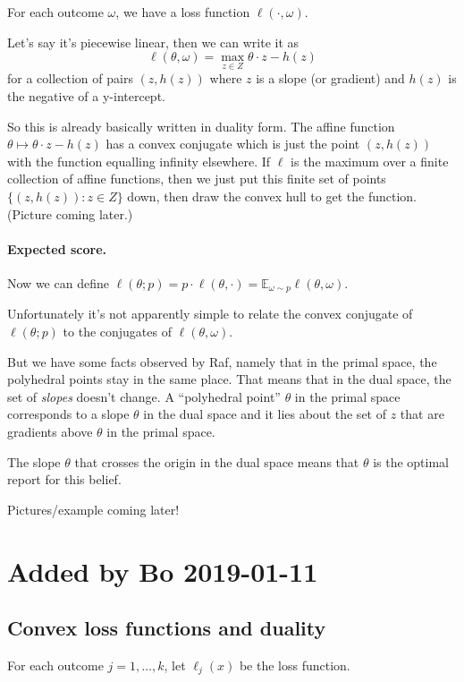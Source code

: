 \documentclass[12pt]{article}
\begin{document}
For each outcome $\omega$, we have a loss function $\ell(\cdot, \omega)$.

Let's say it's piecewise linear, then we can write it as
  \[ \ell(\theta, \omega) = \max_{z \in Z} \theta \cdot z - h(z) \]
for a collection of pairs $(z, h(z))$ where $z$ is a slope (or gradient) and $h(z)$ is the negative of a y-intercept.

So this is already basically written in duality form.
The affine function $\theta \mapsto \theta \cdot z - h(z)$ has a convex conjugate which is just the point $(z, h(z))$ with the function equalling infinity elsewhere.
If $\ell$ is the maximum over a finite collection of affine functions, then we just put this finite set of points $\{(z,h(z)) : z \in Z\}$ down, then draw the convex hull to get the function.
(Picture coming later.)

\paragraph{Expected score.}
Now we can define $\ell(\theta ; p) = p \cdot \ell(\theta, \cdot) = \mathbb{E}_{\omega \sim p} \ell(\theta, \omega)$.

Unfortunately it's not apparently simple to relate the convex conjugate of $\ell(\theta; p)$ to the conjugates of $\ell(\theta, \omega)$.

But we have some facts observed by Raf, namely that in the primal space, the polyhedral points stay in the same place.
That means that in the dual space, the set of \emph{slopes} doesn't change.
A ``polyhedral point'' $\theta$ in the primal space corresponds to a slope $\theta$ in the dual space and it lies about the set of $z$ that are gradients above $\theta$ in the primal space.

The slope $\theta$ that crosses the origin in the dual space means that $\theta$ is the optimal report for this belief.

Pictures/example coming later!


\break

\section{Added by Bo 2019-01-11}

\subsection{Convex loss functions and duality}
For each outcome $j=1,\dots,k$, let $\ell_j(x)$ be the loss function.
\end{document}
